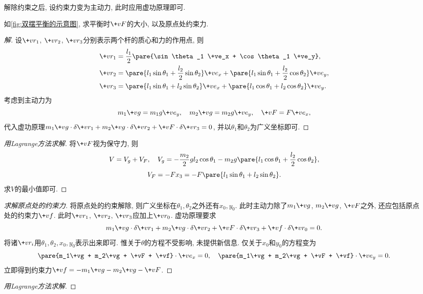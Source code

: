 \documentclass[../LectureNotes.tex]{subfiles}
\begin{document}
解除约束之后, 设约束力变为主动力, 此时应用虚功原理即可.
\begin{sample}
    \begin{ex}
        \label{ex:双摆平衡}
        如\cref{fig:双摆平衡的示意图}, 求平衡时$\+vF$的大小, 以及原点处约束力.
    \end{ex}
    \begin{proof}[解]
        设$\+vr_1$, $\+vr_2$, $\+vr_3$分别表示两个杆的质心和力的作用点, 则
        \begin{align*}
            \+vr_1 &= \frac{l_1}{2} \pare{\sin\theta_1 \+ve_x + \cos\theta_1 \+ve_y}, \\
            \+vr_2 &= \pare{l_1\sin\theta_1 + \frac{l_2}{2}\sin\theta_2}\+ve_x + \pare{l_1\sin\theta_1 + \frac{l_2}{2}\cos\theta_2}\+ve_y, \\
            \+vr_3 &= \pare{l_1 \sin\theta_1 + l_2\sin\theta_2}\+ve_x + \pare{l_1\cos\theta_1 + l_2\cos\theta_2}\+ve_y.
        \end{align*}
        考虑到主动力为
        \[ m_1 \+vg = m_1g\+ve_y,\quad m_2 \+vg = m_2 g\+ve_y,\quad \+vF = F\+ve_x, \]
        代入虚功原理$m_1 \+vg\cdot\delta\+vr_1 + m_2 \+vg\cdot\delta \+vr_2 + \+vF\cdot\delta\+vr_3 = 0$, 并以$\theta_1$和$\theta_2$为广义坐标即可.
    \end{proof}
    \begin{proof}[用Lagrange方法求解]
        将$\+vF$视为保守力, 则
        \[ V = V_g + V_F,\quad V_g = -\frac{m_2}{2}gl_2\cos\theta_1 - m_2 g\pare{l_1 \cos\theta_1 + \frac{l_2}{2}\cos\theta_2}, \]
        \[ V_F = -Fx_3 = -F\pare{l_1\sin\theta_1 + l_2\sin\theta_2}. \]
        求$V$的最小值即可.
    \end{proof}
    \begin{proof}[求解原点处的约束力]
        将原点处的约束解除, 则广义坐标在$\theta_1, \theta_2$之外还有$x_0, y_0$. 此时主动力除了$m_1\+vg$, $m_2\+vg$, $\+vF$之外, 还应包括原点处的约束力$\+vf$. 此时$\+vr_1$, $\+vr_2$, $\+vr_3$应加上$\+vr_0$. 虚功原理要求
        \[ m_1\+vg\cdot\delta \+vr_1 + m_2 \+vg\cdot\delta \+vr_2 + \+vF\cdot\delta\+vr_3 + \+vf\cdot\delta\+vr_0 = 0. \]
        将诸$\+vr_i$用$\theta_1,\theta_2,x_0,y_0$表示出来即可. 惟关于$\theta$的方程不受影响, 未提供新信息. 仅关于$x_0$和$y_0$的方程变为
        \[ \pare{m_1\+vg + m_2\+vg + \+vF + \+vf} \cdot \+ve_x = 0,\quad \pare{m_1\+vg + m_2\+vg + \+vF + \+vf} \cdot \+ve_y = 0. \]
        立即得到约束力$\+vf = -m_1\+vg - m_2\+vg - \+vF$.
    \end{proof}
    \begin{proof}[用Lagrange方法求解]

\end{proof}
\end{sample}
\end{document}
